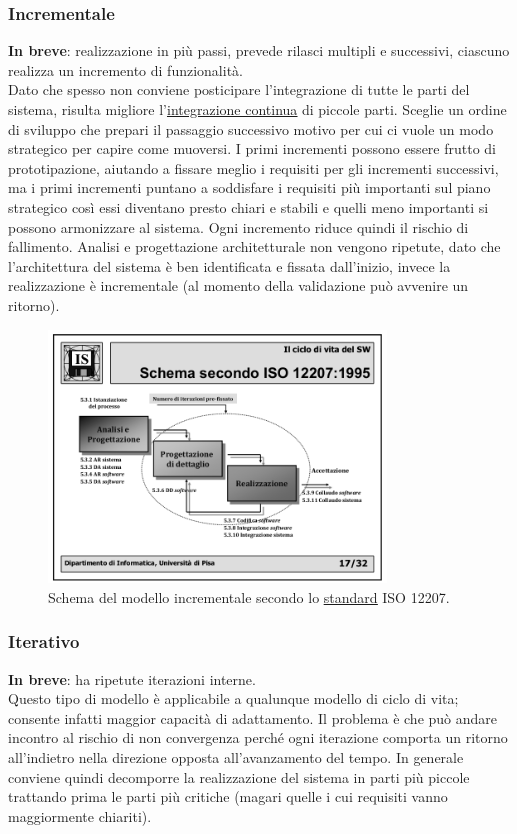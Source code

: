 			\subsubsection{Incrementale}  \label{mincrementale}
			\textbf{In breve}: realizzazione in più passi, prevede rilasci multipli e successivi, ciascuno realizza un incremento di funzionalità. \\
			Dato che spesso non conviene posticipare l'integrazione di tutte le parti del sistema, risulta migliore l'\underline{\hyperref[integrazione]{integrazione continua}} di piccole parti. Sceglie un ordine di sviluppo che prepari il passaggio successivo motivo per cui ci vuole un modo strategico per capire come muoversi. I primi incrementi possono essere frutto di prototipazione,
			aiutando a fissare meglio i requisiti per gli incrementi successivi, ma i primi incrementi puntano a soddisfare i requisiti più importanti sul piano strategico così essi diventano presto chiari e stabili e quelli meno importanti si possono armonizzare al sistema. Ogni incremento riduce quindi il rischio di fallimento. Analisi e progettazione architetturale non vengono ripetute, dato che l'architettura del sistema è ben identificata e fissata dall'inizio, invece la realizzazione è incrementale (al momento della validazione può avvenire un ritorno).
			
			\begin{figure}[H]
				\centering
				\includegraphics[width=0.8\textwidth]{img/incrementale}		
				\caption{Schema del modello incrementale secondo lo \underline{\hyperref[standard]{standard}} ISO 12207.}
			\end{figure} 
			
			\subsubsection{Iterativo}  \label{miterativo}
			\textbf{In breve}: ha ripetute iterazioni interne. \\
			Questo tipo di modello è applicabile a qualunque modello di ciclo di vita; consente infatti maggior capacità di adattamento. Il problema è che può andare incontro al rischio di non convergenza perché ogni iterazione comporta un ritorno all'indietro nella direzione opposta all'avanzamento del tempo. In generale conviene quindi decomporre la realizzazione del sistema in parti più piccole trattando prima le parti più critiche (magari quelle i cui requisiti vanno maggiormente chiariti). 
			
